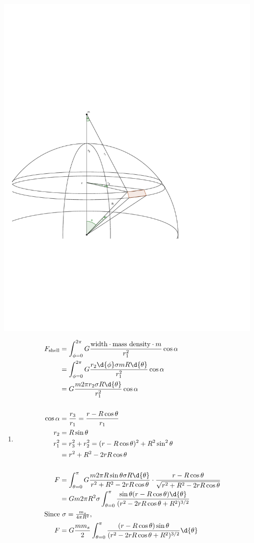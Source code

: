 \documentclass{esg8012pset}
\begin{document}
\begin{solution}
  \begin{center}\includegraphics[width=.5\textwidth]{2009-10-02_Diagram_2_1}\end{center}
  \begin{enumerate}[1)]
    \item \begin{align*}
     F_{\text{shell}} & = \int_{\phi=0}^{2\pi}G \frac{\text{width}\cdot \text{mass density}\cdot m}{r_1^2}\cos\alpha \\
      & = \int_{\phi=0}^{2\pi}G \frac{r_2\d{\phi}\sigma m R\d{\theta}}{r_1^2}\cos\alpha \\
      & = G \frac{m 2\pi r_2 \sigma  R\d{\theta}}{r_1^2}\cos\alpha \\
      \\
    \cos\alpha & = \frac{r_3}{r_1} = \frac{r - R\cos\theta}{r_1} \\
    r_2 & = R\sin\theta \\
    r_1^2 & = r_3^2 + r_2^2  = (r-R\cos\theta)^2+R^2\sin^2\theta \\
     & = r^2 + R^2 - 2rR\cos\theta \\
    \\
    F & = \int_{\theta = 0}^{\pi} G \frac{m 2\pi R\sin\theta \sigma  R\d{\theta}}{r^2 + R^2 - 2rR\cos\theta}\cdot \frac{r - R\cos\theta}{\sqrt{r^2 + R^2 - 2rR\cos\theta}} \\
     & = G m 2\pi R^2 \sigma \int_{\theta = 0}^{\pi} \frac{\sin\theta(r-R\cos\theta) \d{\theta}}{(r^2 - 2rR\cos\theta + R^2)^{3/2}} \\
    \intertext{Since $\sigma = \frac{m_s}{4\pi R^2}$,}
    F & = G \frac{m m_s}{2} \int_{\theta = 0}^{\pi} \frac{(r-R\cos\theta)\sin\theta}{(r^2 - 2rR\cos\theta + R^2)^{3/2}} \d{\theta} \\

\end{align*}
\end{enumerate}
\end{solution}
\end{document}
